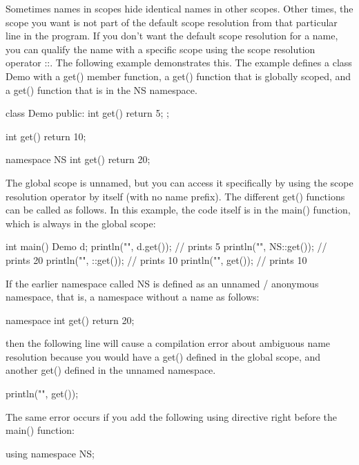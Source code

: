 Sometimes names in scopes hide identical names in other scopes. Other times, the scope you want is not part of the default scope resolution from that particular line in the program. If you don’t want the default scope resolution for a name, you can qualify the name with a specific scope using the scope resolution operator ::. The following example demonstrates this. The example defines a class Demo with a get() member function, a get() function that is globally scoped, and a get() function that is in the NS namespace.

\begin{cpp}
class Demo
{
    public:
    int get() { return 5; }
};

int get() { return 10; }

namespace NS
{
    int get() { return 20; }
}
\end{cpp}

The global scope is unnamed, but you can access it specifically by using the scope resolution operator by itself (with no name prefix). The different get() functions can be called as follows. In this example, the code itself is in the main() function, which is always in the global scope:

\begin{cpp}
int main()
{
    Demo d;
    println("{}", d.get()); // prints 5
    println("{}", NS::get()); // prints 20
    println("{}", ::get()); // prints 10
    println("{}", get()); // prints 10
}
\end{cpp}

If the earlier namespace called NS is defined as an unnamed / anonymous namespace, that is, a namespace without a name as follows:

\begin{cpp}
namespace
{
    int get() { return 20; }
}
\end{cpp}

then the following line will cause a compilation error about ambiguous name resolution because you would have a get() defined in the global scope, and another get() defined in the unnamed namespace.

\begin{cpp}
println("{}", get());
\end{cpp}

The same error occurs if you add the following using directive right before the main() function:

\begin{cpp}
using namespace NS;
\end{cpp}

